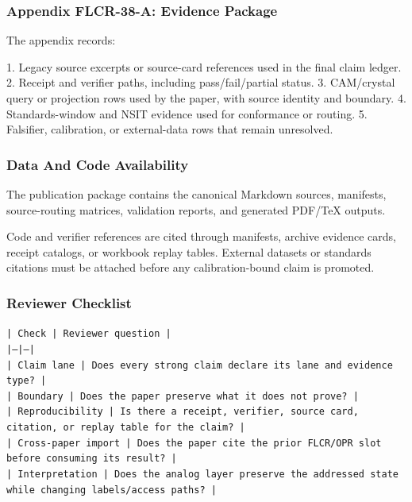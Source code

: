\documentclass[11pt]{article}
\begin{document}
\subsubsection*{Appendix FLCR-38-A: Evidence Package}

The appendix records:

1. Legacy source excerpts or source-card references used in the final claim ledger.
2. Receipt and verifier paths, including pass/fail/partial status.
3. CAM/crystal query or projection rows used by the paper, with source identity and boundary.
4. Standards-window and NSIT evidence used for conformance or routing.
5. Falsifier, calibration, or external-data rows that remain unresolved.

\subsubsection*{Data And Code Availability}

The publication package contains the canonical Markdown sources, manifests, source-routing matrices, validation reports, and generated PDF/TeX outputs.

Code and verifier references are cited through manifests, archive evidence cards, receipt catalogs, or workbook replay tables. External datasets or
standards citations must be attached before any calibration-bound claim is
promoted.

\subsubsection*{Reviewer Checklist}

\noindent\texttt{| Check | Reviewer question |}\\
\noindent\texttt{|---|---|}\\
\noindent\texttt{| Claim lane | Does every strong claim declare its lane and evidence type? |}\\
\noindent\texttt{| Boundary | Does the paper preserve what it does not prove? |}\\
\noindent\texttt{| Reproducibility | Is there a receipt, verifier, source card, citation, or replay table for the claim? |}\\
\noindent\texttt{| Cross-paper import | Does the paper cite the prior FLCR/OPR slot before consuming its result? |}\\
\noindent\texttt{| Interpretation | Does the analog layer preserve the addressed state while changing labels/access paths? |}\\
\end{document}
